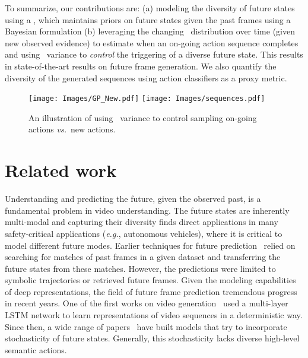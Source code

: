 \documentclass{article} \usepackage{iclr2021_conference,times}
\newcommand{\GP}{}
\def\eg{\emph{e.g.}}
\def\vs{\emph{vs.}}
\begin{document}
To summarize, our contributions are: (a) modeling the diversity of future states using a \GP, which maintains priors on future states given the past frames using a Bayesian formulation (b) leveraging the changing \GP\ distribution over time (given new observed evidence) to estimate when an on-going action sequence completes and using \GP\ variance to \emph{control} the triggering of a diverse future state. This results in state-of-the-art results on future frame generation. We also quantify the diversity of the generated sequences using action classifiers as a proxy metric.

\begin{figure}
    \centering
    \vspace{-0.05in}
\texttt{[image: Images/GP\_New.pdf]}\hfill
    \texttt{[image: Images/sequences.pdf]}
\vspace{-0.05in}
    \caption{An illustration of using \GP\ variance to control sampling on-going actions \vs\ new actions.}
    \vspace{-0.2in}
    \label{fig:gp_illus}
\end{figure}



\section{Related work}
Understanding and predicting the future, given the observed past, is a fundamental problem in video understanding. The future states are inherently multi-modal and capturing their diversity finds direct applications in many safety-critical applications (\eg, autonomous vehicles), where it is critical to model different future modes. Earlier techniques for future prediction~\citep{yuen2010data,walker2014patch} relied on searching for matches of past frames in a given dataset and transferring the future states from these matches. However, the predictions were limited to symbolic trajectories or retrieved future frames. Given the modeling capabilities of deep representations, the field of future frame prediction tremendous progress in recent years. One of the first works on video generation~\citep{Srivastava:2015:ULV:3045118.3045209} used a multi-layer LSTM network to learn representations of video sequences in a deterministic way. Since then, a wide range of  papers~\citep{Oliu:2017,Cricri:2016,VillegasYHLL17,Elsayed:2019,villegas2019high,wang2018eidetic,Castrejon:2019} have built models that try to incorporate stochasticity of future states. Generally, this stochasticity lacks diverse high-level semantic actions.
\end{document}
